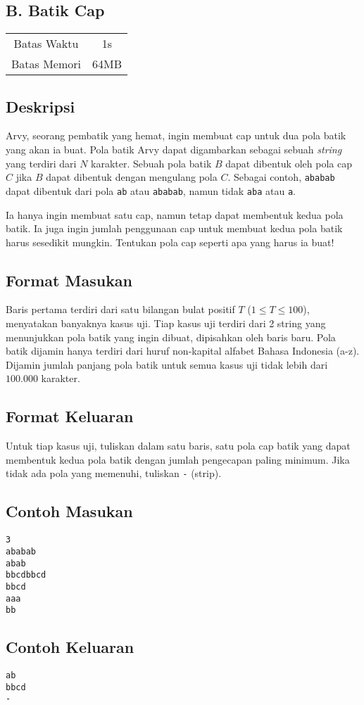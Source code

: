 \documentclass{article}
\begin{document}
\begin{center}
    \section*{B. Batik Cap} %
    \begin{tabular}{ | c c | }
        \hline
        Batas Waktu  & 1s \\    %
        Batas Memori & 64MB \\  %
        \hline
    \end{tabular}
\end{center}

\subsection*{Deskripsi}
Arvy, seorang pembatik yang hemat, ingin membuat cap untuk dua pola batik yang akan ia buat.
Pola batik Arvy dapat digambarkan sebagai sebuah \textit{string} yang terdiri dari $N$ karakter.
Sebuah pola batik $B$ dapat dibentuk oleh pola cap $C$ jika $B$ dapat dibentuk dengan mengulang pola $C$.
Sebagai contoh, \lstinline{ababab} dapat dibentuk dari pola \lstinline{ab} atau \lstinline{ababab}, namun tidak \lstinline{aba} atau \lstinline{a}.

Ia hanya ingin membuat satu cap, namun tetap dapat membentuk kedua pola batik.
Ia juga ingin jumlah penggunaan cap untuk membuat kedua pola batik harus sesedikit mungkin.
Tentukan pola cap seperti apa yang harus ia buat!

\subsection*{Format Masukan}
Baris pertama terdiri dari satu bilangan bulat positif $T$ ($1 \leq T \leq 100$), menyatakan banyaknya kasus uji.
Tiap kasus uji terdiri dari 2 string yang menunjukkan pola batik yang ingin dibuat, dipisahkan oleh baris baru.
Pola batik dijamin hanya terdiri dari huruf non-kapital alfabet Bahasa Indonesia (a-z).
Dijamin jumlah panjang pola batik untuk semua kasus uji tidak lebih dari $100.000$ karakter.

\subsection*{Format Keluaran}
Untuk tiap kasus uji, tuliskan dalam satu baris, satu pola cap batik yang dapat membentuk kedua pola batik dengan jumlah pengecapan paling minimum.
Jika tidak ada pola yang memenuhi, tuliskan \lstinline{-} (strip).
\\

\begin{multicols}{2}
\subsection*{Contoh Masukan}
\begin{lstlisting}
3
ababab
abab
bbcdbbcd
bbcd
aaa
bb
\end{lstlisting}
\columnbreak
\subsection*{Contoh Keluaran}
\begin{lstlisting}
ab
bbcd
-
\end{lstlisting}
\vfill
\null
\end{multicols}

\pagebreak
\end{document}
